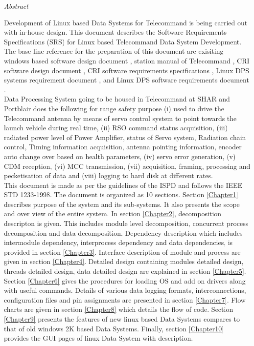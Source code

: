 \documentclass[a4paper, 12pt, oneside]{Thesis}  %
\begin{document}
\begin{center}
\LARGE\textit{Abstract}
\end{center}
\vspace{-3 mm}
\begin{spacing}{1.3}

Development of Linux based Data Systems for Telecommand is being carried out with in-house design. This document describes the Software Requirements Specifications (SRS) for Linux based Telecommand Data System Development. The base line reference for the preparation of this document are exisiting windows based software design document \cite{TCOldSWDoc}, station manual of Telecommand \cite{TCOldStnMan}, CRI software design document \cite{CRISWDoc}, CRI software requirements specifications \cite{CRISRS}, Linux DPS systems requirement document \cite{SYRSLBDPS}, and Linux DPS software requirements document \cite{SRSLBDPS}. \\

Data Processing System going to be housed in Telecommand at SHAR and Portblair does the following for range safety purpose (i) used to drive the Telecommand antenna by means of servo control system to point towards the launch vehicle during real time, (ii) RSO command status acquisition, (iii) radiated power level of Power Amplifier, status of Servo system, Radiation chain control, Timing information acquisition, antenna pointing information, encoder auto change over based on health parameters, (iv) servo error generation, (v) CDM reception, (vi) MCC transmission, (vii) acquisition, framing, processing and pecketisation of data and (viii) logging to hard disk at different rates.\\

This document is made as per the guidelines of the ISPD and follows the IEEE STD 1233-1998. The document is organized as 10 sections. Section \ref{Chapter1} describes purpose of the system and its sub-systems. It also presents the scope and over view of the entire system. In section \ref{Chapter2}, decomposition descripton is given. This includes module level decomposition, concurrent process decomposition and data decomposition. Dependency description which includes intermodule dependency, interprocess dependency and data dependencies, is provided in section \ref{Chapter3}. Interface description  of module and process are given in section \ref{Chapter4}. Detailed design containing modules detailed design, threads detailed design, data detailed design are explained in section \ref{Chapter5}. Section \ref{Chapter6} gives the procedures for loading OS and add on drivers along with useful commands. Details of various data logging formats, interconnections, configuration files and pin assignments are presented in section \ref{Chapter7}. Flow charts are given in section \ref{Chapter8} which details the flow of code. Section \ref{Chapter9} presents the features of new linux based Data Systems compares to that of old windows 2K based Data Systems. Finally, section \ref{Chapter10} provides the GUI pages  of linux Data System with description.



\end{spacing}
\end{document}

